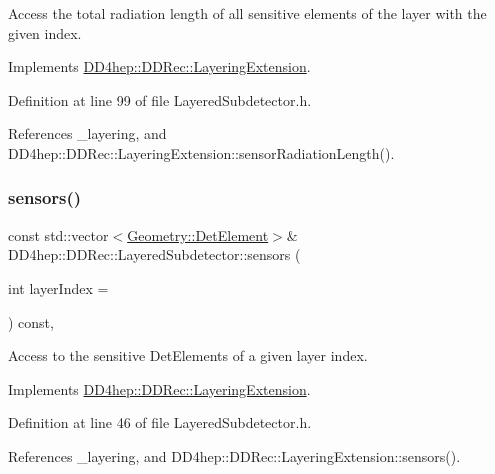 Access the total radiation length of all sensitive elements of the layer with the given index. 



Implements \hyperlink{class_d_d4hep_1_1_d_d_rec_1_1_layering_extension_a1328587b943abe82353de131d9fac071}{D\+D4hep\+::\+D\+D\+Rec\+::\+Layering\+Extension}.



Definition at line 99 of file Layered\+Subdetector.\+h.



References \+\_\+layering, and D\+D4hep\+::\+D\+D\+Rec\+::\+Layering\+Extension\+::sensor\+Radiation\+Length().

\hypertarget{class_d_d4hep_1_1_d_d_rec_1_1_layered_subdetector_a432172e452c14a9ad751b46b6cbcceb9}{}\label{class_d_d4hep_1_1_d_d_rec_1_1_layered_subdetector_a432172e452c14a9ad751b46b6cbcceb9} 
\subsubsection{\texorpdfstring{sensors()}{sensors()}}
{\footnotesize\ttfamily const std\+::vector$<$\hyperlink{class_d_d4hep_1_1_geometry_1_1_det_element}{Geometry\+::\+Det\+Element}$>$\& D\+D4hep\+::\+D\+D\+Rec\+::\+Layered\+Subdetector\+::sensors (\begin{DoxyParamCaption}\item[{int}]{layer\+Index = {} }\end{DoxyParamCaption}) const\hspace{0.3cm}{\ttfamily [inline]}, {\ttfamily [virtual]}}



Access to the sensitive Det\+Elements of a given layer index. 



Implements \hyperlink{class_d_d4hep_1_1_d_d_rec_1_1_layering_extension_a832e6f67c9e507b89f8f41d0a5cc0025}{D\+D4hep\+::\+D\+D\+Rec\+::\+Layering\+Extension}.



Definition at line 46 of file Layered\+Subdetector.\+h.



References \+\_\+layering, and D\+D4hep\+::\+D\+D\+Rec\+::\+Layering\+Extension\+::sensors().

